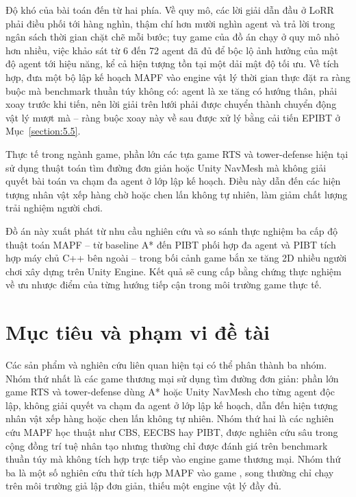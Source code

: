 \documentclass[../DoAn.tex]{subfiles}
\begin{document}
Độ khó của bài toán đến từ hai phía. Về quy mô, các lời giải dẫn đầu ở LoRR phải điều phối tới
hàng nghìn, thậm chí hơn mười nghìn agent và trả lời trong ngân sách thời gian chặt chẽ mỗi
bước; tuy game của đồ án chạy ở quy mô nhỏ hơn nhiều, việc khảo sát từ 6 đến 72 agent đã đủ để
bộc lộ ảnh hưởng của mật độ agent tới hiệu năng, kể cả hiện tượng tồn tại một dải mật độ tối ưu. Về tích hợp, đưa một bộ lập kế hoạch MAPF vào
engine vật lý thời gian thực đặt ra ràng buộc mà benchmark thuần túy không có: agent là xe tăng
có hướng thân, phải xoay trước khi tiến, nên lời giải trên lưới phải được chuyển thành chuyển
động vật lý mượt mà -- ràng buộc xoay này về sau được xử lý bằng cải tiến EPIBT ở
Mục~\ref{section:5.5}.

Thực tế trong ngành game, phần lớn các tựa game RTS và tower-defense hiện tại sử dụng
thuật toán tìm đường đơn giản hoặc Unity NavMesh mà không giải quyết bài toán va chạm
đa agent ở lớp lập kế hoạch. Điều này dẫn đến các hiện tượng nhân vật xếp hàng chờ
hoặc chen lấn không tự nhiên, làm giảm chất lượng trải nghiệm người chơi.

Đồ án này xuất phát từ nhu cầu nghiên cứu và so sánh thực nghiệm ba cấp độ thuật toán
MAPF -- từ baseline A* đến PIBT phối hợp đa agent và PIBT tích hợp máy chủ C++ bên
ngoài -- trong bối cảnh game bắn xe tăng 2D nhiều người chơi xây dựng trên Unity Engine.
Kết quả sẽ cung cấp bằng chứng thực nghiệm về ưu nhược điểm của từng hướng tiếp cận
trong môi trường game thực tế.

\section{Mục tiêu và phạm vi đề tài}
\label{section:1.2}

Các sản phẩm và nghiên cứu liên quan hiện tại có thể phân thành ba nhóm. Nhóm thứ nhất
là các game thương mại sử dụng tìm đường đơn giản: phần lớn game RTS và tower-defense
dùng A* hoặc Unity NavMesh cho từng agent độc lập, không giải quyết va chạm đa agent ở
lớp lập kế hoạch, dẫn đến hiện tượng nhân vật xếp hàng hoặc chen lấn không tự nhiên.
Nhóm thứ hai là các nghiên cứu MAPF học thuật như CBS, EECBS hay PIBT, được nghiên cứu
sâu trong cộng đồng trí tuệ nhân tạo nhưng thường chỉ được đánh giá trên benchmark thuần
túy mà không tích hợp trực tiếp vào engine game thương mại. Nhóm thứ ba là một số nghiên
cứu thử tích hợp MAPF vào game \cite{de2013cooperative}, song thường chỉ chạy trên môi
trường giả lập đơn giản, thiếu một engine vật lý đầy đủ.
\end{document}
